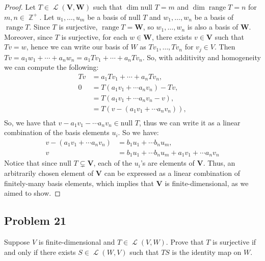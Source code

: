 \documentclass[letterpaper, 12pt]{amsart}
\DeclareMathOperator{\Z}{\mathbb{Z}}
\renewcommand{\null}{\text{null }}
\DeclareMathOperator{\range}{\text{range }}
\DeclareMathOperator{\Ell}{\mathscr{L}}
\theoremstyle{definition}  %
\begin{document}
		\begin{proof}
		Let $T \in \Ell(\mathbf{V},\mathbf{W})$ such that $\dim \null T = m$ and $\dim \range T = n$ for $m,n \in \Z^{+}$.
		Let $u_{1}, \dots, u_{m}$ be a basis of $\null T$ and $w_{1}, \dots, w_{n}$ be a basis of $\range T$.
		Since $T$ is surjective, $\range T = \mathbf{W}$, so $w_{1}, \dots, w_{n}$ is also a basis of $\mathbf{W}$.
		Moreover, since $T$ is surjective, for each $w \in \mathbf{W}$, there exists $v \in \mathbf{V}$ such that $Tv = w$, hence we can write our basis of $W$ as $Tv_{1}, \dots, Tv_{n}$ for $v_{j} \in V$.
		Then $Tv = a_{1}w_{1} + \cdots + a_{n}w_{n} = a_{1}Tv_{1} + \cdots + a_{n}Tv_{n}$.
		So, with additivity and homogeneity we can compute the following:
			\begin{align*}
				Tv &= a_{1}Tv_{1} + \cdots + a_{n}Tv_{n}, \\
				0 &= T(a_{1}v_{1} + \cdots a_{n}v_{n}) - Tv, \\
				&= T(a_{1}v_{1} + \cdots a_{n}v_{n} - v), \\
				&= T(v - (a_{1}v_{1} + \cdots a_{n}v_{n}) ), \\
			\end{align*}
		So, we have that $v - a_{1}v_{1} - \cdots a_{n}v_{n} \in \null T$, thus we can write it as a linear combination of the basis elements $u_{i}$. 
		So we have:
		\begin{align*}
			v - (a_{1}v_{1} + \cdots a_{n}v_{n}) &= b_{1}u_{1} + \cdots b_{n}u_{m}, \\
			v &= b_{1}u_{1} + \cdots b_{n}u_{m} + a_{1}v_{1} + \cdots a_{n}v_{n}
		\end{align*}
		Notice that since $\null T \subsetneq \mathbf{V}$, each of the $u_{i}$'s are elements of $\mathbf{V}$.
		Thus, an arbitrarily chosen element of $\mathbf{V}$ can be expressed as a linear combination of finitely-many basis elements, which implies that $\mathbf{V}$ is finite-dimensional, as we aimed to show.
		\end{proof}

		\subsection*{Problem 21}
		Suppose $V$ is finite-dimensional and $T \in \Ell(V,W)$. 
		Prove that $T$ is surjective if and only if there exists $S \in \Ell(W,V)$ such that $TS$ is the identity map on $W$.
\end{document}
